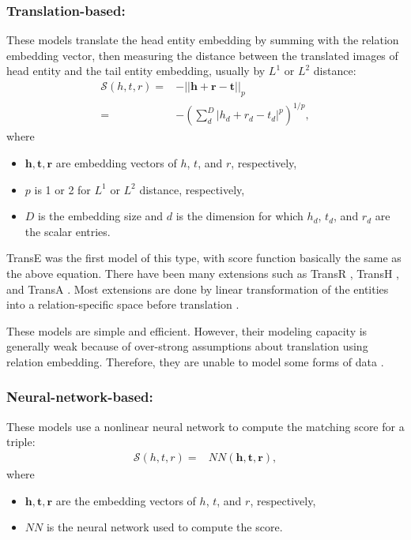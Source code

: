 \documentclass[sigconf,edbt]{acmart-edbt2019}
\def\vh{{\bm{h}}}
\def\vr{{\bm{r}}}
\def\vt{{\bm{t}}}
\def\gS{{\mathcal{S}}}
\begin{document}
\subsubsection{Translation-based:} These models translate the head entity embedding by summing with the relation embedding vector, then measuring the distance between the translated images of head entity and the tail entity embedding, usually by $ L^1 $ or $ L^2 $ distance:
\begin{equation} \label{eq:trans}
\begin{split}
\gS(h,t,r) = &-|| \vh + \vr - \vt ||_p \\
= &-\left(\sum_d^D |h_d + r_d - t_d|^p\right)^{1/p},
\end{split}
\end{equation}
where 
\begin{itemize}
	\item $ \vh, \vt, \vr $ are embedding vectors of $ h $, $ t $, and $ r $, respectively,
	\item $ p $ is 1 or 2 for $ L^1 $ or $ L^2 $ distance, respectively,
	\item $ D $ is the embedding size and $ d $ is the dimension for which $ h_d $, $ t_d $, and $ r_d $ are the scalar entries.
\end{itemize}

TransE \cite{bordes_translatingembeddingsmodeling_2013} was the first model of this type, with score function basically the same as the above equation. There have been many extensions such as TransR \cite{lin_learningentityrelation_2015}, TransH \cite{wang_knowledgegraphembedding_2014}, and TransA \cite{xiao_transaadaptiveapproach_2015}. Most extensions are done by linear transformation of the entities into a relation-specific space before translation \cite{lin_learningentityrelation_2015}.

These models are simple and efficient. However, their modeling capacity is generally weak because of over-strong assumptions about translation using relation embedding. Therefore, they are unable to model some forms of data \cite{wang_multirelationallinkprediction_2018}.

\subsubsection{Neural-network-based:} These models use a nonlinear neural network to compute the matching score for a triple:
\begin{equation} \label{eq:nn}
\begin{split}
\gS(h,t,r) = &NN(\vh, \vt, \vr),
\end{split}
\end{equation}
where 
\begin{itemize}
	\item $ \vh, \vt, \vr $ are the embedding vectors of $ h $, $ t $, and $ r $, respectively,
	\item $ NN $ is the neural network used to compute the score.
\end{itemize}
\end{document}
